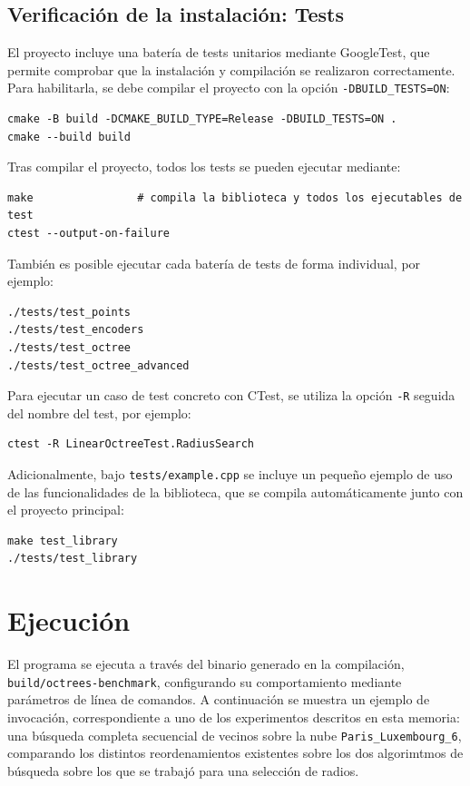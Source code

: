 \subsection{Verificación de la instalación: Tests}

El proyecto incluye una batería de tests unitarios mediante GoogleTest, que
permite comprobar que la instalación y compilación se realizaron
correctamente. Para habilitarla, se debe compilar el proyecto con la opción
\texttt{-DBUILD\_TESTS=ON}:

\begin{verbatim}
cmake -B build -DCMAKE_BUILD_TYPE=Release -DBUILD_TESTS=ON .
cmake --build build
\end{verbatim}

Tras compilar el proyecto, todos los tests se pueden ejecutar mediante:

\begin{verbatim}
make                # compila la biblioteca y todos los ejecutables de test
ctest --output-on-failure
\end{verbatim}

También es posible ejecutar cada batería de tests de forma individual, por
ejemplo:

\begin{verbatim}
./tests/test_points
./tests/test_encoders
./tests/test_octree
./tests/test_octree_advanced
\end{verbatim}

Para ejecutar un caso de test concreto con CTest, se utiliza la opción
\texttt{-R} seguida del nombre del test, por ejemplo:

\begin{verbatim}
ctest -R LinearOctreeTest.RadiusSearch
\end{verbatim}

Adicionalmente, bajo \texttt{tests/example.cpp} se incluye un pequeño ejemplo
de uso de las funcionalidades de la biblioteca, que se compila
automáticamente junto con el proyecto principal:

\begin{verbatim}
make test_library
./tests/test_library
\end{verbatim}

\section{Ejecución}

El programa se ejecuta a través del binario generado en la compilación,
\texttt{build/octrees-benchmark}, configurando su comportamiento mediante
parámetros de línea de comandos. A continuación se muestra un ejemplo de
invocación, correspondiente a uno de los experimentos descritos en esta
memoria: una búsqueda completa secuencial de vecinos
sobre la nube \texttt{Paris\_Luxembourg\_6}, comparando los distintos reordenamientos existentes sobre los dos algorimtmos de búsqueda sobre los que se trabajó para una selección de radios.

